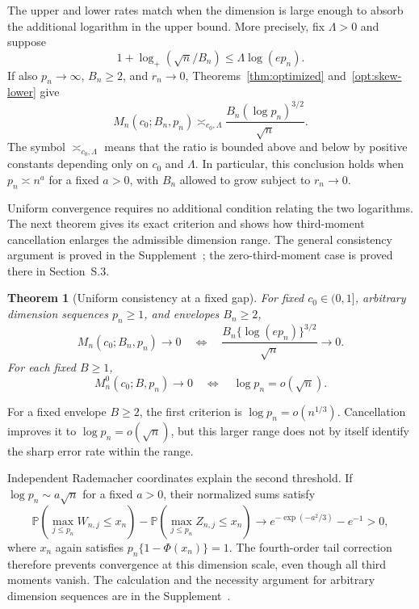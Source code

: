 \documentclass[11pt,letterpaper]{article}
\newtheorem{theorem}{Theorem}
\theoremstyle{remark}
\newcommand{\Pp}{\mathbb P}
\begin{document}
The upper and lower rates match when the dimension is large enough
to absorb the additional logarithm in the upper bound. More precisely,
fix \(\Lambda>0\) and suppose
\[
 1+\log_+(\sqrt n/B_n)\le\Lambda\log(ep_n).
\]
If also \(p_n\to\infty\), \(B_n\ge2\), and \(r_n\to0\),
Theorems~\ref{thm:optimized} and~\ref{opt:skew-lower} give
\begin{equation}
 M_n(c_0;B_n,p_n)\asymp_{c_0,\Lambda}
 \frac{B_n(\log p_n)^{3/2}}{\sqrt n}.
 \label{opt:matching-minimax}
\end{equation}
The symbol \(\asymp_{c_0,\Lambda}\) means that the ratio is bounded
above and below by positive constants depending only on \(c_0\) and
\(\Lambda\). In particular, this conclusion holds when
\(p_n\asymp n^a\) for a fixed \(a>0\), with \(B_n\) allowed to grow
subject to \(r_n\to0\).

Uniform convergence requires no additional condition relating the
two logarithms. The next theorem gives its exact criterion and shows
how third-moment cancellation enlarges the admissible dimension range.
The general consistency argument is proved in the
Supplement~\cite[Section~S.4.2, Theorem~S.4]{Supplement}; the
zero-third-moment case is proved there in Section~S.3.
\begin{theorem}[Uniform consistency at a fixed gap]
\label{opt:consistency}
For fixed \(c_0\in(0,1]\), arbitrary dimension sequences \(p_n\ge1\),
and envelopes \(B_n\ge2\),
\begin{equation}
 M_n(c_0;B_n,p_n)\longrightarrow0
 \quad\Longleftrightarrow\quad
 \frac{B_n\{\log(ep_n)\}^{3/2}}{\sqrt n}\longrightarrow0.
 \label{opt:consistency-iff}
\end{equation}
For each fixed \(B\ge1\),
\[
 M_n^0(c_0;B,p_n)\longrightarrow0
 \quad\Longleftrightarrow\quad \log p_n=o(\sqrt n).
\]
\end{theorem}
For a fixed envelope \(B\ge2\), the first criterion is
\(\log p_n=o(n^{1/3})\). Cancellation improves it to
\(\log p_n=o(\sqrt n)\), but this larger range does not by itself
identify the sharp error rate within the range.

Independent Rademacher coordinates explain the second threshold.
If \(\log p_n\sim a\sqrt n\) for a fixed \(a>0\), their normalized
sums satisfy
\[
 \Pp\!\left(\max_{j\le p_n}W_{n,j}\le x_n\right)
 -\Pp\!\left(\max_{j\le p_n}Z_{n,j}\le x_n\right)
 \longrightarrow e^{-\exp(-a^2/3)}-e^{-1}>0,
\]
where \(x_n\) again satisfies \(p_n\{1-\Phi(x_n)\}=1\).
The fourth-order tail correction therefore prevents convergence at
this dimension scale, even though all third moments vanish.
The calculation and the necessity argument for arbitrary dimension
sequences are in the Supplement~\cite[Section~S.3, Proposition~S.2
and the following proof]{Supplement}.
\end{document}
